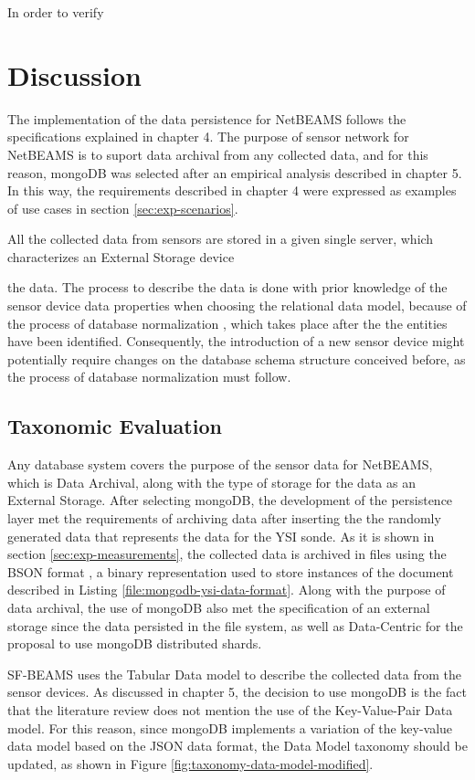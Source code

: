 In order to verify 

\section{Discussion}

The implementation of the data persistence for NetBEAMS follows the
specifications explained in chapter 4. The purpose of sensor network for
NetBEAMS is to suport data archival from any collected data, and for this
reason, mongoDB was selected after an empirical analysis described in chapter
5. In this way, the requirements described in chapter 4 were expressed as
examples of use cases in section \ref{sec:exp-scenarios}. 

All the collected data from sensors are stored in a
given single server, which characterizes an External Storage device

the data. The process to describe the data is done with prior knowledge of the
sensor device data properties when choosing the relational data model, because
of the process of database normalization \cite{db-normalization}, which takes
place after the the entities have been identified. Consequently, the
introduction of a new sensor device might potentially require changes on the
database schema structure conceived before, as the process of database
normalization must follow.

\subsection{Taxonomic Evaluation}

Any database system covers the purpose of the sensor data for NetBEAMS, which
is Data Archival, along with the type of storage for the data as an External
Storage. After selecting mongoDB, the development of the persistence layer met
the requirements of archiving data after inserting the the randomly generated
data that represents the data for the YSI sonde. As it is shown in section
\ref{sec:exp-measurements}, the collected data is archived in files using the
BSON format \cite{bson}, a binary representation used to store instances of
the document described in Listing \ref{file:mongodb-ysi-data-format}. Along
with the purpose of data archival, the use of mongoDB also met the
specification of an external storage since the data persisted in the file
system, as well as Data-Centric for the proposal to use mongoDB distributed
shards. 

SF-BEAMS uses the Tabular Data model to describe the collected data from the
sensor devices. As discussed in chapter 5, the decision to use mongoDB is the
fact that the literature review does not mention the use of the Key-Value-Pair
Data model. For this reason, since mongoDB implements a variation of the 
key-value data model based on the JSON \cite{json} data format, the Data
Model taxonomy should be updated, as shown in Figure
\ref{fig:taxonomy-data-model-modified}.

